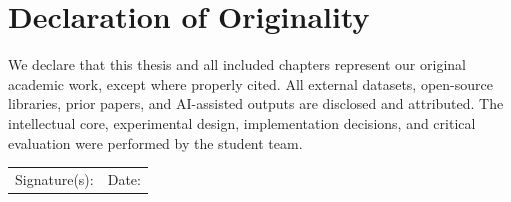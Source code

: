 \chapter*{Declaration of Originality}

We declare that this thesis and all included chapters represent our original
academic work, except where properly cited. All external datasets, open-source
libraries, prior papers, and AI-assisted outputs are disclosed and attributed.
The intellectual core, experimental design, implementation decisions, and
critical evaluation were performed by the student team.

\vspace{2cm}
\noindent
\begin{tabular}{@{}p{}p{}@{}}
Signature(s): \hrulefill & Date: \hrulefill \\
\end{tabular}
